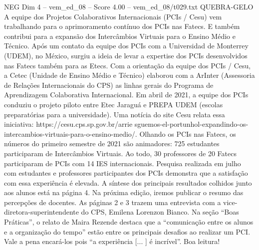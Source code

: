 \begin{textsample}{NEG Dim 4 – vem\_ed\_08 – Score 4.00 – vem\_ed\_08/t029.txt}  \label{ex:f4_neg_029}
QUEBRA-GELO A equipe dos Projetos Colaborativos Internacionais (PCIs / Cesu) vem trabalhando para o aprimoramento contínuo dos PCIs nas Fatecs.
E também contribui para a expansão dos Intercâmbios Virtuais para o Ensino Médio e Técnico.
Após um contato da equipe dos PCIs com a Universidad de Monterrey (UDEM), no México, surgiu a ideia de levar a expertise dos PCIs desenvolvidos nas Fatecs também para as Etecs.
Com a orientação da equipe dos PCIs / Cesu, a Cetec (Unidade de Ensino Médio e Técnico) elaborou com a ArInter (Assessoria de Relações Internacionais do CPS) as linhas gerais do Programa de Aprendizagem Colaborativa Internacional.
Em abril de 2021, a equipe dos PCIs conduziu o projeto piloto entre Etec Jaraguá e PREPA UDEM (escolas preparatórias para a universidade).
Uma notícia do site Cesu relata essa iniciativa: https://cesu.cps.sp.gov.br/arrie sguemos-el-portunhol-expandindo-os-intercambios-virtuais-para-o-ensino-medio/.
Olhando os PCIs nas Fatecs, os números do primeiro semestre de 2021 são animadores: 725 estudantes participaram de Intercâmbios Virtuais.
Ao todo, 30 professores de 20 Fatecs participaram de PCIs com 14 IES internacionais.
Pesquisa realizada em julho com estudantes e professores participantes dos PCIs demonstra que a satisfação com essa experiência é elevada.
A síntese dos principais resultados colhidos junto aos alunos está na página 4.
Na próxima edição, iremos publicar o resumo das percepções de docentes.
As páginas 2 e 3 trazem uma entrevista com a vice-diretora-superintendente do CPS, Emilena Lorenzon Bianco.
Na seção “Boas Práticas”, o relato de Maira Rezende destaca que a “comunicação entre os alunos e a organização do tempo” estão entre os principais desafios ao realizar um PCI.
Vale a pena encará-los pois “a experiência [... ] é incrível”.
Boa leitura!

\end{textsample}
